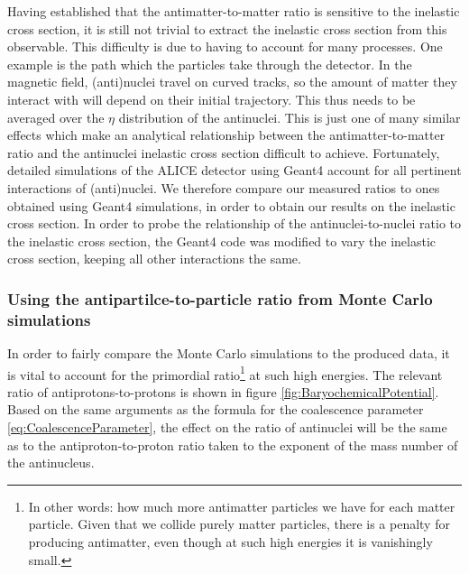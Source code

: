 Having established that the antimatter-to-matter ratio is sensitive to the inelastic cross section, it is still not trivial to extract the inelastic cross section from this observable. This difficulty is due to having to account for many processes. One example is the path which the particles take through the detector. In the magnetic field, (anti)nuclei travel on curved tracks, so the amount of matter they interact with will depend on their initial trajectory. This thus needs to be averaged over the $\eta$ distribution of the antinuclei. This is just one of many similar effects which make an analytical relationship between the antimatter-to-matter ratio and the antinuclei inelastic cross section difficult to achieve. Fortunately, detailed simulations of the ALICE detector using Geant4 account for all pertinent interactions of (anti)nuclei. We therefore compare our measured ratios to ones obtained using Geant4 simulations, in order to obtain our results on the inelastic cross section. In order to probe the relationship of the antinuclei-to-nuclei ratio to the inelastic cross section, the Geant4 code was modified to vary the inelastic cross section, keeping all other interactions the same.
\subsubsection{Using the antipartilce-to-particle ratio from Monte Carlo simulations}\label{sec:MCSim}
In order to fairly compare the Monte Carlo simulations to the produced data, it is vital to account for the primordial ratio\footnote{In other words: how much more antimatter particles we have for each matter particle. Given that we collide purely matter particles, there is a penalty for producing antimatter, even though at such high energies it is vanishingly small.} at such high energies. The relevant ratio of antiprotons-to-protons is shown in figure \ref{fig:BaryochemicalPotential}. Based on the same arguments as the formula for the coalescence parameter \ref{eq:CoalescenceParameter}, the effect on the ratio of antinuclei will be the same as to the antiproton-to-proton ratio taken to the exponent of the mass number of the antinucleus. 

